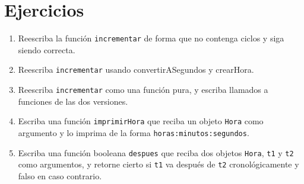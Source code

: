 \section{Ejercicios}
\begin{enumerate}

\item Reescriba la función \texttt{incrementar} 
de forma que no contenga ciclos y siga siendo correcta.

\item Reescriba \texttt{incrementar} usando 
convertirASegundos y crearHora.

\item Reescriba \texttt{incrementar} como una función 
pura, y escriba llamados a funciones de las dos versiones.

\item Escriba una función  \texttt{imprimirHora} que reciba
un objeto \texttt{Hora} como argumento y lo imprima de la forma
 \texttt{horas:minutos:segundos}.

\item Escriba una  función booleana \texttt{despues} que reciba dos
objetos \texttt{Hora}, \texttt{t1} y \texttt{t2} como argumentos, y 
retorne cierto si  \texttt{t1} va después de \texttt{t2} cronológicamente
y falso en caso contrario.

\end{enumerate}
